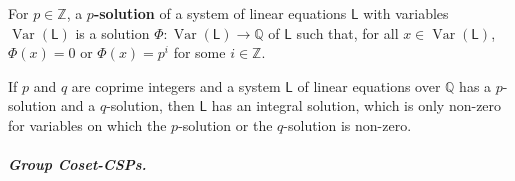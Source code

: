 \documentclass[a4paper,english, thm-restate]{lipics-v2021}
\newcommand{\ZZ}{\mathbb{Z}}
\newcommand{\QQ}{\mathbb{Q}}
\newcommand{\defining}[1]{\textbf{#1}}
\newcommand{\leqs}{\mathsf{L}}
\newcommand{\Var}[1]{\operatorname*{Var}(#1)}
\begin{document}
	\begin{definition}
		For $p\in \ZZ$, a \defining{$p$-solution} of a system of linear equations $\leqs$ with variables $\Var{\leqs}$ is a solution $\Phi \colon \Var{\leqs} \to \QQ$ 
		of $\leqs$  such that, for all  $x \in \Var{\leqs}$,
		$\Phi(x)=0$ or $\Phi(x) =p^i$ for some $i \in \ZZ$.
	\end{definition}
	\begin{lemma}[restate=pqSolutionImpliesIntegral, name=\cite{BerkholzGrohe2015}]
		\label{lem:p-q-solution-implies-integral}
		If $p$ and $q$ are coprime integers and
		a system $\leqs$ of linear equations over $\QQ$ has a $p$-solution and a $q$-solution,
		then $\leqs$ has an integral solution,
		which is only non-zero for variables
		on which the $p$-solution or the $q$-solution is non-zero.
	\end{lemma}
	
	\subparagraph{Group Coset-CSPs.}
	\label{sec:groupCSP}
	
\end{document}
